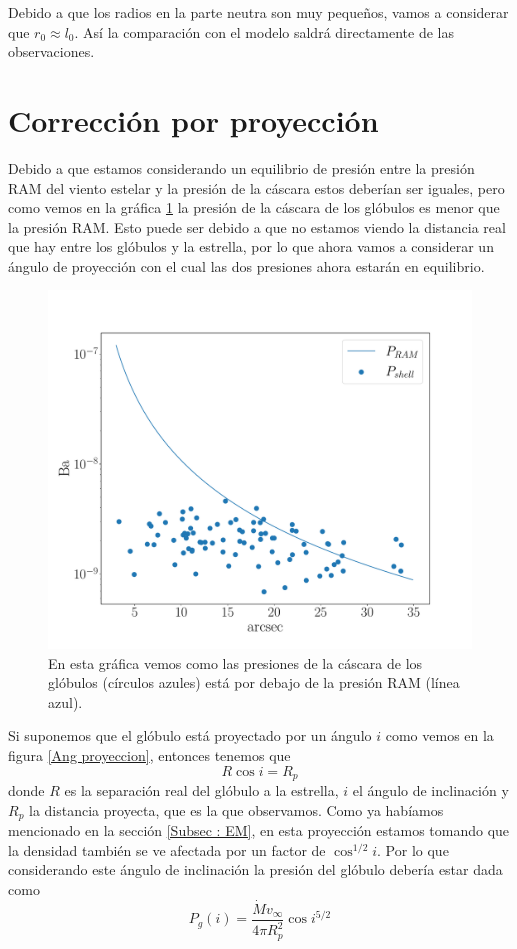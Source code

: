 \documentclass{book}
\begin{document}
Debido a que los radios en la parte neutra son muy pequeños, vamos a considerar que $r_0\approx l_0$. Así la comparación con el modelo saldrá directamente de las observaciones. 


\section{Corrección por proyección}\label{Sec:proyeccion}

Debido a que estamos considerando un equilibrio de presión entre la presión RAM del viento estelar y la presión de la cáscara estos deberían ser iguales, pero como vemos en la gráfica \ref{graf_presion} la presión de la cáscara de los glóbulos es menor que la presión RAM. Esto puede ser debido a que no estamos viendo la distancia real que hay entre los glóbulos y la estrella, por lo que ahora vamos a considerar un ángulo de proyección con el cual las dos presiones ahora estarán en equilibrio.

\begin{figure}[htb]
    \centering
    \includegraphics[width=\textwidth]{imagenes Chapter 4/Presiones.pdf}
    \caption{En esta gráfica vemos como las presiones de la cáscara de los glóbulos (círculos azules) está por debajo de la presión RAM (línea azul).}
    \label{graf_presion}
\end{figure}

Si suponemos que el glóbulo está proyectado por un ángulo $i$ como vemos en la figura \ref{Ang proyeccion}, entonces tenemos que \[R\cos i=R_p\] donde $R$ es la separación real del glóbulo a la estrella, $i$ el ángulo de inclinación y $R_p$ la distancia proyecta, que es la que observamos. Como ya habíamos mencionado en la sección \ref{Subsec : EM}, en esta proyección estamos tomando que la densidad también se ve afectada por un factor de $\cos^{1/2}i$.  Por lo que considerando este ángulo de inclinación la presión del glóbulo debería estar dada como \[P_{g}(i)=\frac{\dot{M}v_\infty}{4\pi R_p^2}\cos{i}^{5/2}\]
\end{document}

